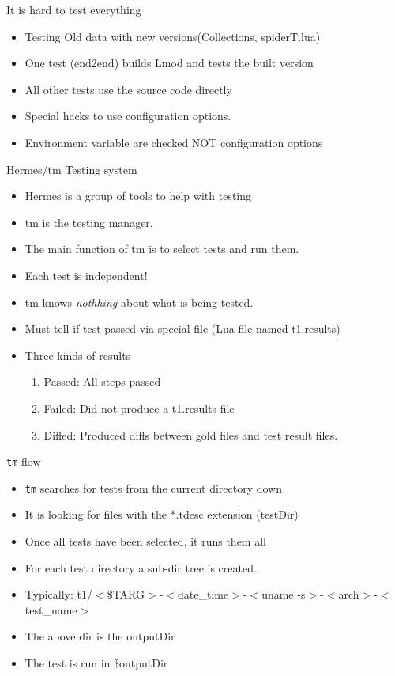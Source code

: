 \documentclass{beamer}
\begin{document}
\begin{frame}{It is hard to test everything}
  \begin{itemize}
    \item Testing Old data with new versions(Collections, spiderT.lua)
    \item One test (end2end) builds Lmod and tests the built version
    \item All other tests use the source code directly
    \item Special hacks to use configuration options. 
    \item Environment variable are checked NOT configuration options
  \end{itemize}
\end{frame}

\begin{frame}{Hermes/tm Testing system}
  \begin{itemize}
    \item Hermes is a group of tools to help with testing
    \item tm is the testing manager.
    \item The main function of tm is to select tests and run them.
    \item Each test is independent!
    \item tm knows \emph{nothhing} about what is being tested.
    \item Must tell if test passed via special file (Lua file named
      t1.results)
    \item Three kinds of results
      \begin{enumerate}
        \item Passed: All steps passed
        \item Failed: Did not produce a t1.results file
        \item Diffed: Produced diffs between gold files and test
          result files.
      \end{enumerate}
  \end{itemize}
\end{frame}

\begin{frame}{\texttt{tm} flow}
  \begin{itemize}
    \item \texttt{tm} searches for tests from the current directory
      down
    \item It is looking for files with the *.tdesc extension (testDir)
    \item Once all tests have been selected, it runs them all
    \item For each test directory a sub-dir tree is created.
    \item Typically: t1/$<$\$TARG$>$-$<$date\_time$>$-$<$uname
      -s$>$-$<$arch$>$-$<$test\_name$>$
    \item The above dir is the outputDir
    \item The test is run in \$outputDir
  \end{itemize}
\end{frame}
\end{document}
